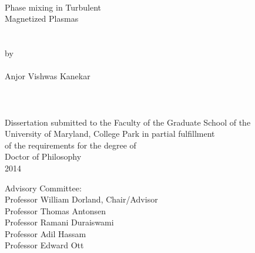 
\thispagestyle{empty}
\hbox{\ }
\vspace{1in}
\renewcommand{\baselinestretch}{1}
\small\normalsize
\begin{center}

\large{{Phase mixing in Turbulent \\
Magnetized Plasmas}}\\
\ \\
\ \\
\large{by} \\
\ \\
\large{Anjor Vishwas Kanekar}%
\ \\
\ \\
\ \\
\ \\
\normalsize
Dissertation submitted to the Faculty of the Graduate School of the \\
University of Maryland, College Park in partial fulfillment \\
of the requirements for the degree of \\
Doctor of Philosophy \\
2014
\end{center}

\vspace{7.5em}

\noindent Advisory Committee: \\
Professor William Dorland, Chair/Advisor \\
Professor Thomas Antonsen \\
Professor Ramani Duraiswami \\
Professor Adil Hassam \\
Professor Edward Ott 
